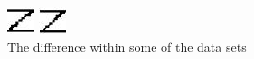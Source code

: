 \begin{figure}[h]
\begin{minipage}{0.04\textwidth}
\end{minipage}
\begin{minipage}{0.04\textwidth}
	\includegraphics[width=\textwidth]{../pics/Z19}
\end{minipage}
\begin{minipage}{0.04\textwidth}
	\includegraphics[width=\textwidth]{../pics/Z20}
\end{minipage}
\caption{The difference within some of the data sets}
\end{figure}


